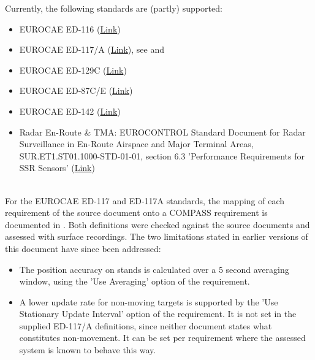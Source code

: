 Currently, the following standards are (partly) supported:
\begin{itemize}  
\item EUROCAE ED-116 (\href{https://eshop.eurocae.net/eurocae-documents-and-reports/ed-116/}{Link})
\item EUROCAE ED-117/A (\href{https://eshop.eurocae.net/eurocae-documents-and-reports/ed-117a/}{Link}), see  and 
\item EUROCAE ED-129C (\href{https://eshop.eurocae.net/eurocae-documents-and-reports/ed-129c/}{Link})
\item EUROCAE ED-87C/E (\href{https://eshop.eurocae.net/eurocae-documents-and-reports/ed-87c/}{Link})
\item EUROCAE ED-142 (\href{https://eshop.eurocae.net/eurocae-documents-and-reports/ed-142/}{Link})
\item Radar En-Route \& TMA: EUROCONTROL Standard Document for Radar Surveillance in En-Route Airspace and Major Terminal Areas, SUR.ET1.ST01.1000-STD-01-01, section 6.3 'Performance Requirements for SSR Sensors' (\href{https://www.eurocontrol.int/sites/default/files/publication/files/surveillance-standard-document-for-radar-surveillance-in-en-route-airspace-and-major-terminal-areas199703.pdf}{Link})
\end{itemize}
\ \\

For the EUROCAE ED-117 and ED-117A standards, the mapping of each requirement of the source document onto a COMPASS requirement is documented in . Both definitions were checked against the source documents and assessed with surface recordings. The two limitations stated in earlier versions of this document have since been addressed:
\begin{itemize}
\item The position accuracy on stands is calculated over a 5 second averaging window, using the 'Use Averaging' option of the  requirement.
\item A lower update rate for non-moving targets is supported by the 'Use Stationary Update Interval' option of the  requirement. It is not set in the supplied ED-117/A definitions, since neither document states what constitutes non-movement. It can be set per requirement where the assessed system is known to behave this way.
\end{itemize}
\ \\

